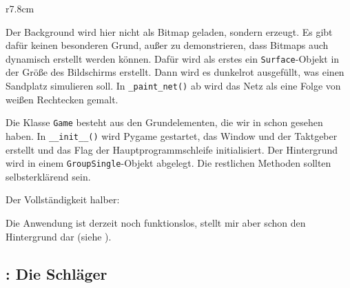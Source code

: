 
\begin{wrapfigure}[9]{r}{7.8cm}%
	\begin{center}%
		\vspace{-1cm}%
	\end{center}%
\end{wrapfigure}%
Der Background wird hier nicht als Bitmap geladen, sondern erzeugt. Es gibt dafür keinen besonderen Grund, außer zu demonstrieren, dass Bitmaps auch dynamisch erstellt werden können. Dafür wird als erstes ein \texttt{Surface}-Objekt in der Größe des Bildschirms erstellt. Dann wird es dunkelrot ausgefüllt, was einen Sandplatz simulieren soll. In \texttt{\_paint\_net()} ab  wird das Netz als eine Folge von weißen Rechtecken gemalt.


Die Klasse \texttt{Game} besteht aus den Grundelementen, die wir in  schon gesehen haben. In \texttt{\_\_init\_\_()} wird Pygame gestartet, das Window und der Taktgeber erstellt und das Flag der Hauptprogrammschleife initialisiert. Der Hintergrund wird in einem \texttt{Group\-Single}-Objekt abgelegt. Die restlichen Methoden sollten selbsterklärend sein.


Der Vollständigkeit halber: 


Die Anwendung ist derzeit noch funktionslos, stellt mir aber schon den Hintergrund dar (siehe ).

\subsection{: Die Schläger}

